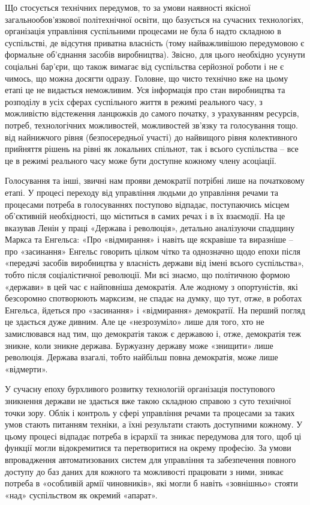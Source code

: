 \documentclass[12pt,a4paper,openany]{book}
\begin{document}
Що стосується технічних передумов, то за умови наявності якісної загальнообов’язкової політехнічної освіти, що базується на сучасних технологіях, організація управління суспільними процесами не була б надто складною в суспільстві, де відсутня приватна власність (тому найважливішою передумовою є формальне об’єднання засобів виробництва). Звісно, для цього необхідно усунути соціальні бар’єри, що також вимагає від суспільства серйозної роботи і не є чимось, що можна досягти одразу. Головне, що чисто технічно вже на цьому етапі це не видається неможливим. Уся інформація про стан виробництва та розподілу в усіх сферах суспільного життя в режимі реального часу, з можливістю відстеження ланцюжків до самого початку, з урахуванням ресурсів, потреб, технологічних можливостей, можливостей зв’язку та голосування тощо. від найнижчого рівня (безпосередньої участі) до найвищого рівня колективного прийняття рішень на рівні як локальних спільнот, так і всього суспільства – все це в режимі реального часу може бути доступне кожному члену асоціації.

Голосування та інші, звичні нам прояви демократії потрібні лише на початковому етапі. У процесі переходу від управління людьми до управління речами та процесами потреба в голосуваннях поступово відпадає, поступаючись місцем об’єктивній необхідності, що міститься в самих речах і в їх взаємодії. На це вказував Ленін у праці «Держава і революція», детально аналізуючи спадщину Маркса та Енгельса: «Про «відмирання» і навіть ще яскравіше та виразніше – про «засинання» Енгельс говорить цілком чітко та однозначно щодо епохи після «передачі засобів виробництва у власність держави від імені всього суспільства», тобто після соціалістичної революції. Ми всі знаємо, що політичною формою «держави» в цей час є найповніша демократія. Але жодному з опортуністів, які безсоромно спотворюють марксизм, не спадає на думку, що тут, отже, в роботах Енгельса, йдеться про «засинання» і «відмирання» демократії. На перший погляд це здається дуже дивним. Але це «незрозуміло» лише для того, хто не замислювався над тим, що демократія також є державою і, отже, демократія теж зникне, коли зникне держава. Буржуазну державу може «знищити» лише революція. Держава взагалі, тобто найбільш повна демократія, може лише «відмерти».

У сучасну епоху бурхливого розвитку технологій організація поступового зникнення держави не здається вже такою складною справою з суто технічної точки зору. Облік і контроль у сфері управління речами та процесами за таких умов стають питанням техніки, а їхні результати стають доступними кожному. У цьому процесі відпадає потреба в ієрархії та зникає передумова для того, щоб ці функції могли відокремитися та перетворитися на окрему професію. За умови впровадження автоматизованих систем для управління та забезпечення повного доступу до баз даних для кожного та можливості працювати з ними, зникає потреба в «особливій армії чиновників», які могли б навіть «зовнішньо» стояти «над» суспільством як окремий «апарат».
\end{document}

